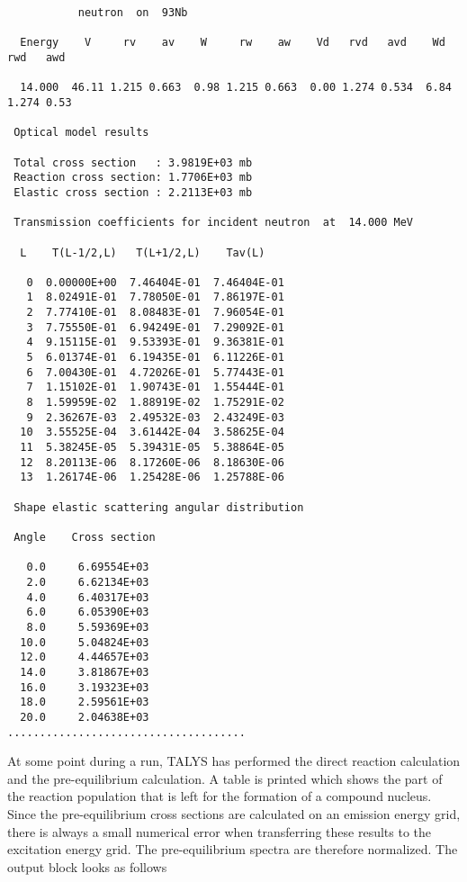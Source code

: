 \begin{samplecase}
{\begin{verbatim}
           neutron  on  93Nb
 
  Energy    V     rv    av    W     rw    aw    Vd   rvd   avd    Wd   rwd   awd
   
  14.000  46.11 1.215 0.663  0.98 1.215 0.663  0.00 1.274 0.534  6.84 1.274 0.53
   
 Optical model results  
   
 Total cross section   : 3.9819E+03 mb
 Reaction cross section: 1.7706E+03 mb
 Elastic cross section : 2.2113E+03 mb
   
 Transmission coefficients for incident neutron  at  14.000 MeV
   
  L    T(L-1/2,L)   T(L+1/2,L)    Tav(L)
   
   0  0.00000E+00  7.46404E-01  7.46404E-01
   1  8.02491E-01  7.78050E-01  7.86197E-01
   2  7.77410E-01  8.08483E-01  7.96054E-01
   3  7.75550E-01  6.94249E-01  7.29092E-01
   4  9.15115E-01  9.53393E-01  9.36381E-01
   5  6.01374E-01  6.19435E-01  6.11226E-01
   6  7.00430E-01  4.72026E-01  5.77443E-01
   7  1.15102E-01  1.90743E-01  1.55444E-01
   8  1.59959E-02  1.88919E-02  1.75291E-02
   9  2.36267E-03  2.49532E-03  2.43249E-03
  10  3.55525E-04  3.61442E-04  3.58625E-04
  11  5.38245E-05  5.39431E-05  5.38864E-05
  12  8.20113E-06  8.17260E-06  8.18630E-06
  13  1.26174E-06  1.25428E-06  1.25788E-06

 Shape elastic scattering angular distribution

 Angle    Cross section

   0.0     6.69554E+03
   2.0     6.62134E+03
   4.0     6.40317E+03
   6.0     6.05390E+03
   8.0     5.59369E+03
  10.0     5.04824E+03
  12.0     4.44657E+03
  14.0     3.81867E+03
  16.0     3.19323E+03
  18.0     2.59561E+03
  20.0     2.04638E+03
.....................................
\end{verbatim} } \renewcommand{\baselinestretch}{1.07}\small\normalsize
\noindent
At some point during a run, TALYS has performed the direct reaction calculation
and the pre-equilibrium calculation. A table is printed which shows the part 
of the reaction population that is left for the formation of a compound 
nucleus. Since the 
pre-equilibrium cross sections are calculated on an emission energy grid, 
there is always a small numerical error when transferring these results to the 
excitation energy grid. The pre-equilibrium spectra are therefore normalized.
The output block looks as follows

{\small \begin{verbatim}


\end{verbatim}}
\end{samplecase}
